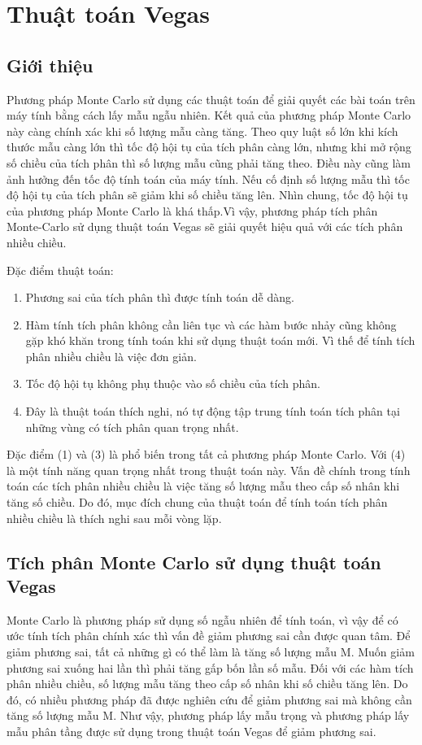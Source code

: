 \chapter{Thuật toán Vegas}\label{ch:3}
\section{Giới thiệu}\label{sec:3.1}
Phương pháp Monte Carlo sử dụng các thuật toán để giải quyết các bài toán trên máy tính bằng cách lấy mẫu ngẫu nhiên. Kết quả của phương pháp Monte Carlo này càng chính xác khi số lượng mẫu càng tăng. Theo quy luật số lớn khi kích thước mẫu càng lớn thì tốc độ hội tụ của tích phân càng lớn, nhưng khi mở rộng số chiều của tích phân thì số lượng mẫu cũng phải tăng theo. Điều này cũng làm ảnh hưởng đến tốc độ tính toán của máy tính. Nếu cố định số lượng mẫu thì tốc độ hội tụ của tích phân sẽ giảm khi số chiều tăng lên. Nhìn chung, tốc độ hội tụ của phương pháp Monte Carlo là khá thấp.Vì vậy, phương pháp tích phân Monte-Carlo sử dụng thuật toán Vegas \cite{vegas} sẽ giải quyết hiệu quả với các tích phân nhiều chiều.
\par
Đặc điểm thuật toán: 
\begin{enumerate}
      \item Phương sai của tích phân thì được tính toán dễ dàng.
      \item Hàm tính tích phân không cần liên tục và các hàm bước nhảy cũng không gặp khó khăn trong tính toán khi sử dụng thuật toán mới. Vì thế để tính tích phân nhiều chiều là việc đơn giản.
      \item Tốc độ hội tụ không phụ thuộc vào số chiều của tích phân.
      \item Đây là thuật toán thích nghi, nó tự động tập trung tính toán tích phân tại những vùng có tích phân quan trọng nhất.
\end{enumerate}
Đặc điểm (1) và (3) là phổ biến trong tất cả phương pháp Monte Carlo. Với (4) là một tính năng quan trọng nhất trong thuật toán này. Vấn đề chính trong tính toán các tích phân nhiều chiều là việc tăng số lượng mẫu theo cấp số nhân khi tăng số chiều. 
Do đó, mục đích chung của thuật toán để tính toán tích phân nhiều chiều là thích nghi sau mỗi vòng lặp.
\section{Tích phân Monte Carlo sử dụng thuật toán Vegas}\label{sec:3.2}
Monte Carlo là phương pháp sử dụng số ngẫu nhiên để tính toán, vì vậy để có ước tính tích phân chính xác thì 
vấn đề giảm phương sai cần được quan tâm. 
Để giảm phương sai, tất cả những gì có thể làm là tăng số lượng mẫu M. 
Muốn giảm phương sai xuống hai lần thì phải tăng gấp bốn lần số mẫu. 
Đối với các hàm tích phân nhiều chiều, 
số lượng mẫu tăng theo cấp số nhân khi số chiều tăng lên. 
Do đó, có nhiều phương pháp đã được nghiên cứu để giảm phương sai mà không cần tăng số lượng mẫu M. 
Như vậy, phương pháp lấy mẫu trọng và phương pháp lấy mẫu phân tầng được sử dụng trong thuật toán Vegas để giảm phương sai.
\par
